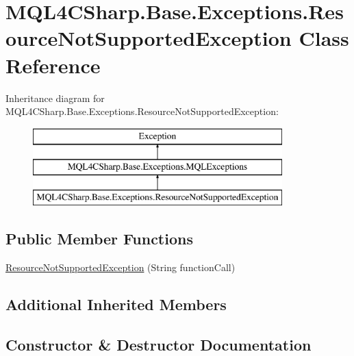 \hypertarget{class_m_q_l4_c_sharp_1_1_base_1_1_exceptions_1_1_resource_not_supported_exception}{}\section{M\+Q\+L4\+C\+Sharp.\+Base.\+Exceptions.\+Resource\+Not\+Supported\+Exception Class Reference}
\label{class_m_q_l4_c_sharp_1_1_base_1_1_exceptions_1_1_resource_not_supported_exception}
Inheritance diagram for M\+Q\+L4\+C\+Sharp.\+Base.\+Exceptions.\+Resource\+Not\+Supported\+Exception\+:\begin{figure}[H]
\begin{center}
\leavevmode
\includegraphics[height=3.000000cm]{class_m_q_l4_c_sharp_1_1_base_1_1_exceptions_1_1_resource_not_supported_exception}
\end{center}
\end{figure}
\subsection*{Public Member Functions}
\begin{DoxyCompactItemize}
\item 
\hyperlink{class_m_q_l4_c_sharp_1_1_base_1_1_exceptions_1_1_resource_not_supported_exception_ac36d055938d0a9a68827012ddee27e29}{Resource\+Not\+Supported\+Exception} (String function\+Call)
\end{DoxyCompactItemize}
\subsection*{Additional Inherited Members}


\subsection{Constructor \& Destructor Documentation}
